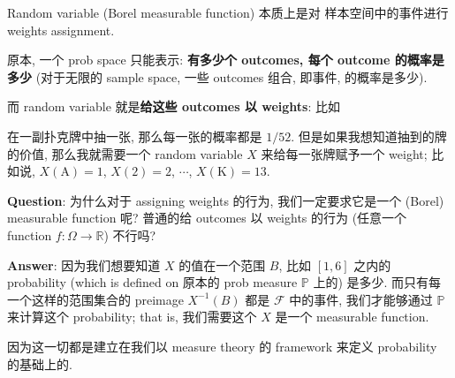 \begin{remark}

    Random variable (Borel measurable function) 本质上是对
    样本空间中的事件进行 weights assignment.

    原本, 一个 prob space 只能表示: \textbf{有多少个 outcomes, 每个 outcome 的概率是多少}
     (对于无限的 sample space, 一些 outcomes 组合, 即事件, 的概率是多少).
    
    而 random variable 就是\textbf{给这些 outcomes 以 weights}: 比如
    
    \begin{example}

    在一副扑克牌中抽一张, 那么每一张的概率都是 \(1/52\). 
    但是如果我想知道抽到的牌的价值, 
    那么我就需要一个 random variable \(X\) 来给每一张牌赋予一个 weight; 
    比如说, \(X(\text{A}) = 1\), \(X(\text{2}) = 2\), \(\cdots\), \(X(\text{K}) = 13\).\\
    \end{example}

    \textbf{Question}: 为什么对于 assigning weights 的行为, 我们一定要求它是一个 (Borel) measurable function 呢?
    普通的给 outcomes 以 weights 的行为 (任意一个 function $f:
    \Omega \to \mathbb{R}$) 不行吗? 

    \textbf{Answer}:
    因为我们想要知道 $X$ 的值在一个范围 $B$, 比如 \([1,6]\) 
    之内的 probability (which is defined on
    原本的 prob measure \( \mathbb{P}\) 上的) 是多少. 而只有每一个这样的范围集合的
    preimage \(X^{-1}(B)\) 都是 \(\mathcal{F}\) 中的事件, 
    我们才能够通过 \(\mathbb{P}\) 来计算这个 probability; that is, 
    我们需要这个 \(X\) 是一个 measurable function.

    因为这一切都是建立在我们以 measure theory 的 framework 
    来定义 probability 的基础上的.\\
\end{remark}




